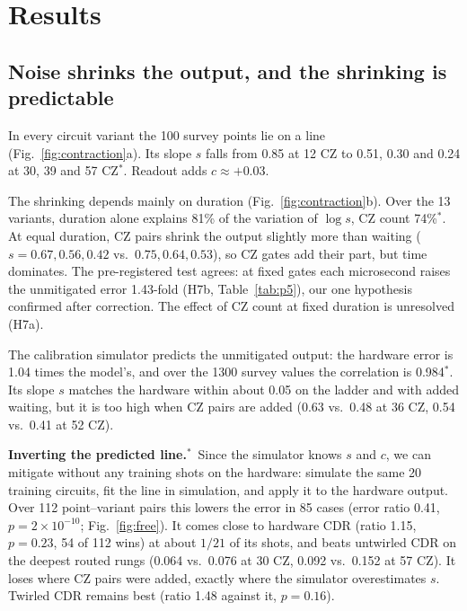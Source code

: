 \documentclass[aps,pra,twocolumn,superscriptaddress,nofootinbib,10pt]{revtex4-2}
\newcommand{\ex}{$^{*}$}
\begin{document}
\section{Results}

\subsection{Noise shrinks the output, and the shrinking is predictable}

In every circuit variant the 100 survey points lie on a line (Fig.~\ref{fig:contraction}a).
Its slope $s$ falls from 0.85 at 12 CZ to 0.51, 0.30 and 0.24 at 30, 39 and 57 CZ\ex. Readout
adds $c\approx+0.03$.

The shrinking depends mainly on duration (Fig.~\ref{fig:contraction}b). Over the 13 variants,
duration alone explains 81\% of the variation of $\log s$, CZ count 74\%\ex. At equal duration,
CZ pairs shrink the output slightly more than waiting ($s=0.67,0.56,0.42$ vs.\ $0.75,0.64,0.53$),
so CZ gates add their part, but time dominates. The pre-registered test agrees: at fixed gates
each microsecond raises the unmitigated error 1.43-fold (H7b, Table~\ref{tab:p5}), our one
hypothesis confirmed after correction. The effect of CZ count at fixed duration is unresolved
(H7a).

The calibration simulator predicts the unmitigated output: the hardware error is 1.04 times
the model's, and over the 1300 survey values the correlation is 0.984\ex. Its slope $s$
matches the hardware within about 0.05 on the ladder and with added waiting, but it is too high
when CZ pairs are added (0.63 vs.\ 0.48 at 36 CZ, 0.54 vs.\ 0.41 at 52 CZ).

\textbf{Inverting the predicted line.}\ex\ Since the simulator knows $s$ and $c$, we can mitigate
without any training shots on the hardware: simulate the same 20 training circuits, fit the
line in simulation, and apply it to the hardware output. Over 112 point--variant pairs this
lowers the error in 85 cases (error ratio 0.41, $p=2\times10^{-10}$;
Fig.~\ref{fig:free}). It comes close to hardware CDR (ratio 1.15, $p=0.23$, 54 of 112 wins) at
about $1/21$ of its shots, and beats untwirled CDR on the deepest routed rungs (0.064 vs.\ 0.076
at 30 CZ, 0.092 vs.\ 0.152 at 57 CZ). It loses where CZ pairs were added, exactly where the
simulator overestimates $s$. Twirled CDR remains best (ratio 1.48 against it, $p=0.16$).
\end{document}
